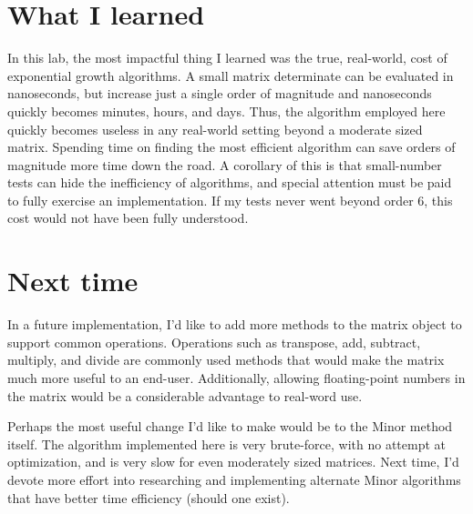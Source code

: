 \documentclass[a4paper,12pt]{article}
\begin{document}

\section{What I learned}
In this lab, the most impactful thing I learned was the true, real-world, cost of exponential growth algorithms.  A small matrix
determinate can be evaluated in nanoseconds, but increase just a single order of magnitude and nanoseconds quickly becomes
minutes, hours, and days.  Thus, the algorithm employed here quickly becomes useless in any real-world setting beyond a moderate
sized matrix.  Spending time on finding the most efficient algorithm can save orders of magnitude more time down the road.  A corollary
of this is that small-number tests can hide the inefficiency of algorithms, and special attention must be paid to fully exercise an implementation.  
If my tests never went beyond order 6, this cost would not have been fully understood.


\section{Next time}
In a future implementation, I'd like to add more methods to the matrix object to support common operations.  Operations such
as transpose, add, subtract, multiply, and divide are commonly used methods that would make the matrix much more useful
to an end-user.  Additionally, allowing floating-point numbers in the matrix would be a considerable advantage to real-word use.

Perhaps the most useful change I'd like to make would be to the Minor method itself.  The algorithm implemented here is 
very brute-force, with no attempt at optimization, and is very slow for even moderately sized matrices.  Next time, I'd devote 
more effort into researching and implementing alternate Minor algorithms that have better time efficiency (should one exist).


\end{document}
